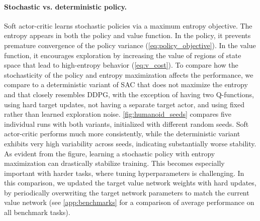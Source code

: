 \documentclass{article}
\begin{document}
\vspace{-0.1in}
\paragraph{Stochastic vs. deterministic policy.} Soft actor-critic learns stochastic policies via a maximum entropy objective. The entropy appears in both the policy and value function. In the policy, it prevents premature convergence of the policy variance (\autoref{eq:policy_objective}). In the value function, it encourages exploration by increasing the value of regions of state space that lead to high-entropy behavior (\autoref{eq:v_cost}). To compare how the stochasticity of the policy and entropy maximization affects the performance, we compare to a deterministic variant of SAC that does not maximize the entropy and that closely resembles DDPG, with the exception of having two Q-functions, using hard target updates, not having a separate target actor, and using fixed rather than learned exploration noise. \autoref{fig:humanoid_seeds} compares five individual runs with both variants, initialized with different random seeds. Soft actor-critic performs much more consistently, while the deterministic variant exhibits very high variability across seeds, indicating substantially worse stability. As evident from the figure, learning a stochastic policy with entropy maximization can drastically stabilize training. This becomes especially important with harder tasks, where tuning hyperparameters is challenging. In this comparison, we updated the target value network weights with hard updates, by periodically overwriting the target network parameters to match the current value network (see \autoref{app:benchmarks} for a comparison of average performance on all benchmark tasks). 
\end{document}
